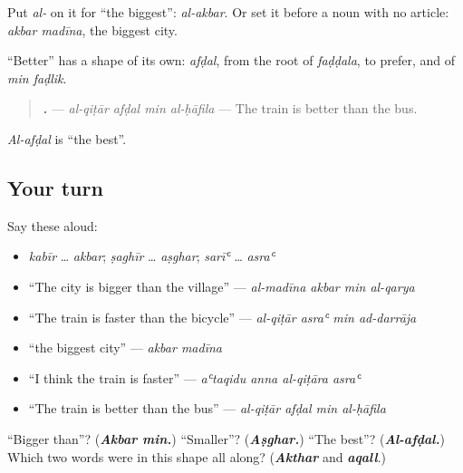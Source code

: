 \begin{grammarlens}[title={Grammar Lens: the biggest, and better}]
Put \emph{al-} on it for \textquotedblleft{}the biggest\textquotedblright{}: \emph{al-akbar}. Or set it before a noun with no article: \textbf{ } \emph{akbar madīna}, the biggest city.

\textquotedblleft{}Better\textquotedblright{} has a shape of its own: \textbf{} \emph{afḍal}, from the root of \emph{faḍḍala}, to prefer, and of \emph{min faḍlik}.

\begin{quote}
\textbf{   .} — \emph{al-qiṭār afḍal min al-ḥāfila} — The train is better than the bus.
\end{quote}

\emph{Al-afḍal} is \textquotedblleft{}the best\textquotedblright{}.
\end{grammarlens}

\subsection*{Your turn}
Say these aloud:

\begin{itemize}
\raggedright
  \item \emph{kabīr} … \emph{akbar}; \emph{ṣaghīr} … \emph{aṣghar}; \emph{sarīʿ} … \emph{asraʿ}
  \item \textquotedblleft{}The city is bigger than the village\textquotedblright{} — \emph{al-madīna akbar min al-qarya}
  \item \textquotedblleft{}The train is faster than the bicycle\textquotedblright{} — \emph{al-qiṭār asraʿ min ad-darrāja}
  \item \textquotedblleft{}the biggest city\textquotedblright{} — \emph{akbar madīna}
  \item \textquotedblleft{}I think the train is faster\textquotedblright{} — \emph{aʿtaqidu anna al-qiṭāra asraʿ}
  \item \textquotedblleft{}The train is better than the bus\textquotedblright{} — \emph{al-qiṭār afḍal min al-ḥāfila}
\end{itemize}

\begin{tcolorbox}[breakable,colback=teal!4,colframe=teal!35!black,title={Before you move on}]
\textquotedblleft{}Bigger than\textquotedblright{}? (\emph{\textbf{Akbar min.}}) \textquotedblleft{}Smaller\textquotedblright{}? (\emph{\textbf{Aṣghar.}}) \textquotedblleft{}The best\textquotedblright{}? (\emph{\textbf{Al-afḍal.}}) Which two words were in this shape all along? (\emph{\textbf{Akthar}} and \emph{\textbf{aqall}}.)
\end{tcolorbox}

